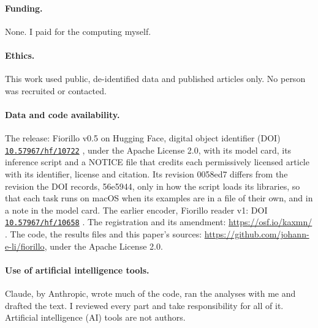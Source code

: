 \documentclass[11pt,letterpaper]{article}
\newcommand{\doi}[1]{\href{https://doi.org/#1}{\nolinkurl{#1}}}
\newcommand{\idn}[1]{#1}%
\begin{document}
\paragraph{Funding.} None. I paid for the computing myself.

\paragraph{Ethics.} This work used public, de-identified data and published articles only. No person was recruited or contacted.

\paragraph{Data and code availability.} The release: Fiorillo v0.5 on Hugging Face, digital object identifier (DOI) \doi{10.57967/hf/10722} \citep{fiorillo05}, under the Apache License 2.0, with its model card, its inference script and a NOTICE file that credits each permissively licensed article with its identifier, license and citation. Its revision \idn{0058ed7} differs from the revision the DOI records, \idn{56e5944}, only in how the script loads its libraries, so that each task runs on macOS when its examples are in a file of their own, and in a note in the model card. The earlier encoder, Fiorillo reader v1: DOI \doi{10.57967/hf/10658} \citep{reader1}. The registration and its amendment: \mbox{\url{https://osf.io/kaxmn/}} \citep{osfreg}. The code, the results files and this paper's sources: \mbox{\url{https://github.com/johann-e-li/fiorillo}}, under the Apache License 2.0.

\paragraph{Use of artificial intelligence tools.} Claude, by Anthropic, wrote much of the code, ran the analyses with me and drafted the text. I reviewed every part and take responsibility for all of it. Artificial intelligence (AI) tools are not authors.
\end{document}
